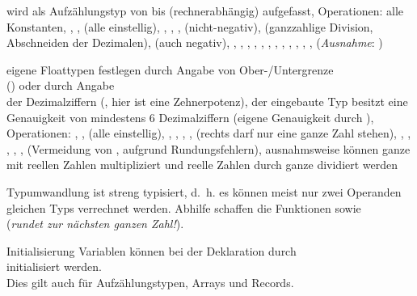\begin{Def}{}
    wird als Aufzählungstyp von  bis
     (rechnerabhängig) aufgefasst,
    Operationen: alle Konstanten, \adacode{+}, \adacode{-}, 
    (alle einstellig), \adacode{+}, \adacode{-}, \adacode{*}, 
    (nicht-negativ), \adacode{/} (ganzzahlige Division, Abschneiden der
    Dezimalen),  (auch negativ), \adacode{**},
    \adacode{=}, \adacode{/=}, \adacode{<}, \adacode{<=}, \adacode{>},
    \adacode{>=}, , , , ,
    , 
    (\emph{Ausnahme}: )
\end{Def}

\begin{Def}{}
    eigene Floattypen festlegen
    durch Angabe von Ober-/Untergrenze \\
    ()
    oder durch Angabe \\
    der Dezimalziffern
    (, hier ist 
    eine Zehnerpotenz),
    der eingebaute Typ  besitzt eine Genauigkeit von mindestens
    6 Dezimalziffern (eigene Genauigkeit durch
    ),
    Operationen: \adacode{+}, \adacode{-},  (alle einstellig),
    \adacode{+}, \adacode{-}, \adacode{*}, \adacode{/}, \adacode{**}
    (rechts darf nur eine ganze Zahl stehen), \adacode{=}, \adacode{/=},
    \adacode{<}, \adacode{<=}, \adacode{>}, \adacode{>=}
    (Vermeidung von \adacode{=}, \adacode{/=} aufgrund Rundungsfehlern),
    ausnahmsweise können ganze mit reellen Zahlen multipliziert
    und reelle Zahlen durch ganze dividiert werden
\end{Def}

\begin{Def}{Typumwandlung}
    \Ada{} ist streng typisiert, d.~h. es können meist nur zwei Operanden
    gleichen Typs verrechnet werden.
    Abhilfe schaffen die Funktionen  sowie\\
     (\emph{rundet zur nächsten ganzen Zahl!}).
\end{Def}

\begin{Def}{Initialisierung}
    Variablen können bei der Deklaration durch \\
    initialisiert werden. \\
    Dies gilt auch für Aufzählungstypen, Arrays und Records.
\end{Def}


